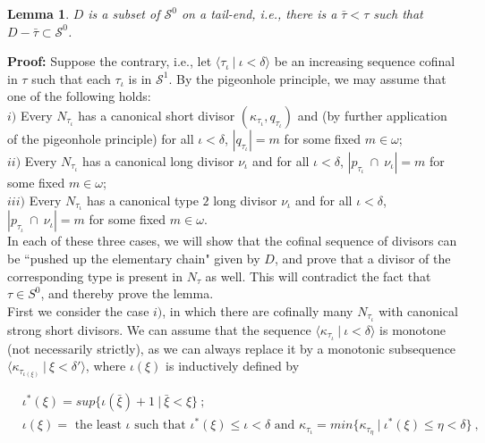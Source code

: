 \documentclass[12pt]{article}
\newtheorem{lem}[thm]{Lemma}
\begin{document}
\begin{lem} \label{divisor push-up}
$D$ is a subset of $\mathcal{S}^0$ on a tail-end, i.e., there is a $\bar{\tau} < \tau$ such that $D - \bar{\tau} \subset \mathcal{S}^0$.
\end{lem}

\textbf{Proof:}  Suppose the contrary, i.e., let $\langle \tau_\iota \ | \ \iota < \delta \rangle$ be an increasing sequence cofinal in $\tau$ such that each $\tau_\iota$ is in $\mathcal{S}^1$.  By the pigeonhole principle, we may assume that one of the following holds:\\

$i)$ Every $N_{\tau_\iota}$ has a canonical short divisor $(\kappa_{\tau_\iota} , q_{\tau_\iota} )$ and (by further application of the pigeonhole principle) for all $\iota < \delta$, $|q_{\tau_\iota}| = m$ for some fixed $m \in \omega$;\\

$ii)$ Every $N_{\tau_\iota}$ has a canonical long divisor $\nu_\iota$ and for all $\iota < \delta$, $|p_{\tau_\iota} \ \cap \ \nu_\iota| = m$ for some fixed $m \in \omega$;\\

$iii)$ Every $N_{\tau_\iota}$ has a canonical type $2$ long divisor $\nu_\iota$ and for all $\iota < \delta$, $|p_{\tau_\iota} \ \cap \ \nu_\iota| = m$ for some fixed $m \in \omega$.\\

In each of these three cases, we will show that the cofinal sequence of divisors can be ``pushed up the elementary chain" given by $D$, and prove that a divisor of the corresponding type is present in $N_\tau$ as well.  This will contradict the fact that $\tau \in S^0$, and thereby prove the lemma.\\



First we consider the case $i)$, in which there are cofinally many $N_{\tau_\iota}$ with canonical strong short divisors.  We can assume that the sequence $\langle \kappa_{\tau_\iota} \ | \ \iota < \delta \rangle$ is monotone (not necessarily strictly), as we can always replace it by a monotonic subsequence $\langle \kappa_{\tau_{\iota (\xi )}} \ | \ \xi < \delta' \rangle$, where $\iota (\xi)$ is inductively defined by

\[
\begin{split}
& \iota^* (\xi) = sup \{ \iota ( \bar{\xi} ) + 1 \ | \ \bar{\xi} < \xi \} \ ;\\
& \iota (\xi) = \text{ the least $\iota$ such that } \iota^* (\xi) \leq \iota < \delta \text{ and } \kappa_{\tau_\iota} = min \{ \kappa_{\tau_\eta} \ | \ \iota^* (\xi) \leq \eta < \delta \} \ ,
\end{split}
\]
\end{document}
